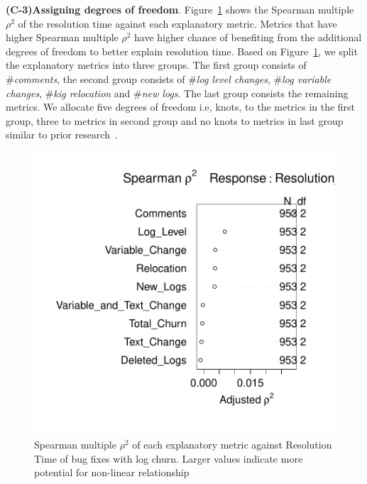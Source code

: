 \textbf{(C-3)Assigning degrees of freedom}. Figure~\ref{fig:Spearman} shows the Spearman multiple $\rho^{2}$ of the resolution time against each explanatory metric. Metrics that have higher Spearman multiple $\rho^{2}$ have higher chance of benefiting from the additional degrees of freedom to better explain resolution time. Based on Figure~\ref{fig:Spearman}, we split the explanatory metrics into three groups. The first group consists of \#\textsl{comments}, the second group consists of \#\textsl{log level changes}, \#\textsl{log variable changes}, \#\textsl{kig relocation} and \#\textsl{new logs}. The last group consists the remaining metrics. We allocate five degrees of freedom i.e, knots, to the metrics in the first group, three to metrics in second group and no knots to metrics in last group similar to prior research~\cite{ShaneOLS}.


\begin{figure}[t]
	\begin{minipage}[b]{.7\columnwidth}
			\centering 
		\hspace*{1cm}	\includegraphics[width=1\columnwidth]{QpidDF}	
		
	\end{minipage}
	\captionsetup{labelsep = colon}
	\hspace*{1.7cm}\caption{Spearman multiple $\rho^{2}$ of each explanatory metric against Resolution Time of bug fixes with log churn. Larger values indicate more potential for non-linear relationship \label{fig:Spearman}}
\end{figure}




